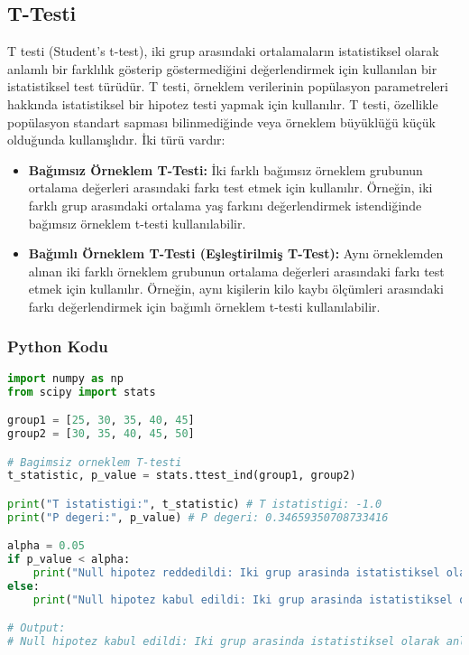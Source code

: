 \newpage

\subsection{T-Testi}
T testi (Student's t-test), iki grup arasındaki ortalamaların istatistiksel olarak anlamlı bir farklılık gösterip göstermediğini değerlendirmek için kullanılan bir istatistiksel test türüdür. T testi, örneklem verilerinin popülasyon parametreleri hakkında istatistiksel bir hipotez testi yapmak için kullanılır. T testi, özellikle popülasyon standart sapması bilinmediğinde veya örneklem büyüklüğü küçük olduğunda kullanışlıdır. İki türü vardır:

\begin{itemize}
    \item \textbf{Bağımsız Örneklem T-Testi:} İki farklı bağımsız örneklem grubunun ortalama değerleri arasındaki farkı test etmek için kullanılır. Örneğin, iki farklı grup arasındaki ortalama yaş farkını değerlendirmek istendiğinde bağımsız örneklem t-testi kullanılabilir.
    \item \textbf{Bağımlı Örneklem T-Testi (Eşleştirilmiş T-Test):} Aynı örneklemden alınan iki farklı örneklem grubunun ortalama değerleri arasındaki farkı test etmek için kullanılır. Örneğin, aynı kişilerin kilo kaybı ölçümleri arasındaki farkı değerlendirmek için bağımlı örneklem t-testi kullanılabilir.
\end{itemize}

\subsubsection{Python Kodu}

\begin{lstlisting}[language=Python]
import numpy as np
from scipy import stats

group1 = [25, 30, 35, 40, 45]
group2 = [30, 35, 40, 45, 50]

# Bagimsiz orneklem T-testi
t_statistic, p_value = stats.ttest_ind(group1, group2)

print("T istatistigi:", t_statistic) # T istatistigi: -1.0
print("P degeri:", p_value) # P degeri: 0.34659350708733416

alpha = 0.05
if p_value < alpha:
    print("Null hipotez reddedildi: Iki grup arasinda istatistiksel olarak anlamli bir fark vardir.")
else:
    print("Null hipotez kabul edildi: Iki grup arasinda istatistiksel olarak anlamli bir fark yoktur.")

# Output:
# Null hipotez kabul edildi: Iki grup arasinda istatistiksel olarak anlamli bir fark yoktur.
\end{lstlisting}

